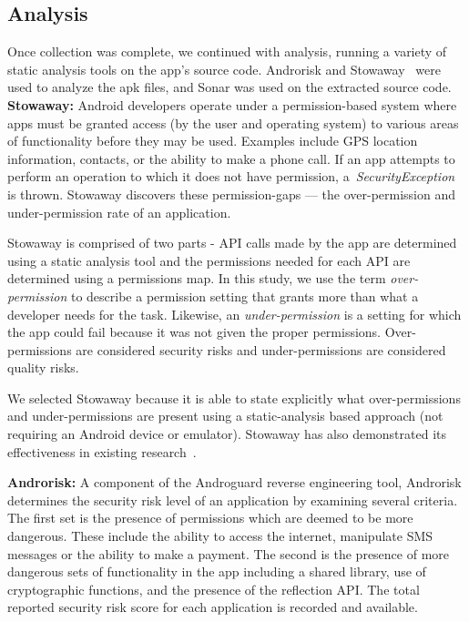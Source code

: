 \documentclass[journal,transmag]{IEEEtran}
\begin{document}
\subsection{Analysis}
Once collection was complete, we continued with analysis, running a variety of static analysis tools on the app's source code. Androrisk and Stowaway~\cite{Felt:2011:APD:2046707.2046779} were used to analyze the apk files, and Sonar was used on the extracted source code.\\

\textbf{Stowaway:} Android developers operate under a permission-based system where apps must be granted access (by the user and operating system) to various areas of functionality before they may be used. Examples include GPS location information, contacts, or the ability to make a phone call. If an app attempts to perform an operation to which it does not have permission, a~\emph{SecurityException} is thrown. Stowaway discovers these permission-gaps --- the over-permission and under-permission rate of an application.

Stowaway is comprised of two parts - API calls made by the app are determined using a static analysis tool and the permissions needed for each API are determined using a permissions map. In this study, we use the term \emph{over-permission} to describe a permission setting that grants more than what a developer needs for the task. Likewise, an \emph{under-permission} is a setting for which the app could fail because it was not given the proper permissions. Over-permissions are considered security risks and under-permissions are considered quality risks.

We selected Stowaway because it is able to state explicitly what over-permissions and under-permissions are present using a static-analysis based approach (not requiring an Android device or emulator). Stowaway has also demonstrated its effectiveness in existing research~\cite{Felt:2011:APD:2046707.2046779}. %


\textbf{Androrisk:} A component of the Androguard reverse engineering tool, Androrisk determines the security risk level of an application by examining several criteria. The first set is the presence of permissions which are deemed to be more dangerous. These include the ability to access the internet, manipulate SMS messages or the ability to make a payment. The second is the presence of more dangerous sets of functionality in the app including a shared library, use of cryptographic functions, and the presence of the reflection API.
 The total reported security risk score for each application is recorded and available.
\end{document}
